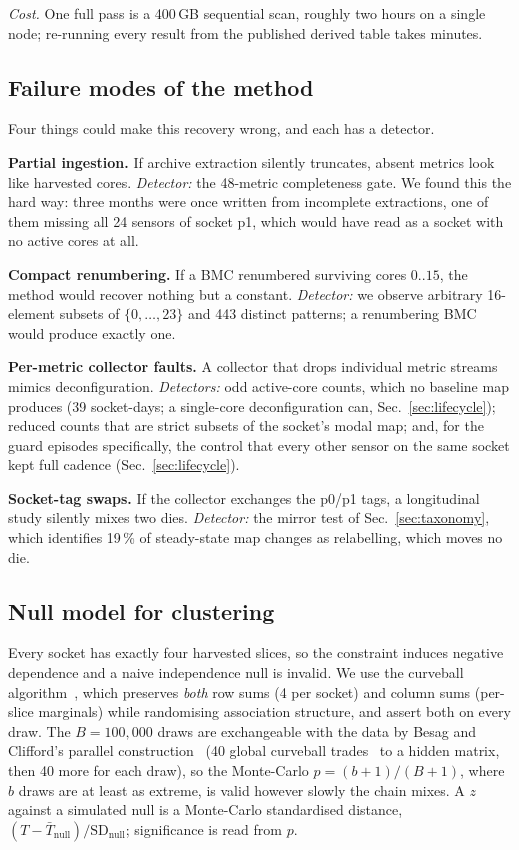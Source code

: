 \documentclass[10pt,conference]{IEEEtran}
\begin{document}
\emph{Cost.} One full pass is a 400\,GB sequential scan, roughly two hours on a single node;
re-running every result from the published derived table takes minutes.

\subsection{Failure modes of the method}
\label{sec:failure}
Four things could make this recovery wrong, and each has a detector.

\textbf{Partial ingestion.} If archive extraction silently truncates, absent metrics look like
harvested cores. \emph{Detector:} the 48-metric completeness gate. We found this the hard way:
three months were once written from incomplete extractions, one of them missing all 24 sensors of
socket p1, which would have read as a socket with no active cores at all.

\textbf{Compact renumbering.} If a BMC renumbered surviving cores $0..15$, the method would
recover nothing but a constant. \emph{Detector:} we observe arbitrary 16-element subsets of
$\{0,\dots,23\}$ and 443 distinct patterns; a renumbering BMC would produce exactly one.

\textbf{Per-metric collector faults.} A collector that drops individual metric streams mimics
deconfiguration. \emph{Detectors:} odd active-core counts, which no baseline map
produces (39 socket-days; a single-core deconfiguration can, Sec.~\ref{sec:lifecycle}); reduced counts that are strict subsets of the socket's modal map; and,
for the guard episodes specifically, the control that every other sensor on the same socket kept
full cadence (Sec.~\ref{sec:lifecycle}).

\textbf{Socket-tag swaps.} If the collector exchanges the p0/p1 tags, a longitudinal study
silently mixes two dies. \emph{Detector:} the mirror test of Sec.~\ref{sec:taxonomy}, which
identifies 19\,\% of steady-state map changes as relabelling, which moves no die.

\subsection{Null model for clustering}
\label{sec:null}
Every socket has exactly four harvested slices, so the constraint induces negative dependence and a
naive independence null is invalid. We use the curveball algorithm~\cite{strona2014curveball},
which preserves \emph{both} row sums (4 per socket) and column sums (per-slice marginals) while
randomising association structure, and assert both on every draw. The $B=100{,}000$ draws are
exchangeable with the data by Besag and Clifford's parallel construction~\cite{besag1989generalized}
(40 global curveball trades~\cite{carstens2018global} to a hidden matrix, then 40 more for each
draw), so the Monte-Carlo $p=(b+1)/(B+1)$, where $b$ draws are at least as extreme, is valid however
slowly the chain mixes. A $z$ against a simulated null is a Monte-Carlo standardised distance,
$(T-\bar{T}_{\mathrm{null}})/\mathrm{SD}_{\mathrm{null}}$; significance is read from $p$.
\end{document}
